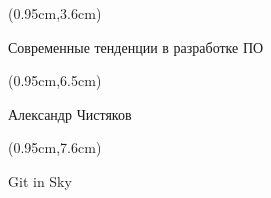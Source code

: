 \documentclass[xetex,18pt,aspectratio=43]{beamer}
\title[Современные тенденции в разработке ПО]{}
\author[Александр Чистяков, Git in Sky]{}
\date{}
\newcommand\Bigfont{\fontsize{22}{22}\selectfont}
\newcommand\Authorfont{\fontsize{17}{17}\selectfont}
\newcommand\Orgfont{\fontsize{13}{13}\selectfont}
\begin{document}
{ %
    \begin{frame}[plain]
      \begin{textblock*}{\framewidth}(0.95cm,3.6cm) %
        \Bigfont
          \begin{center}
          Современные тенденции в разработке ПО
          \end{center}
      \end{textblock*}
      \begin{textblock*}{\framewidth}(0.95cm,6.5cm) %
        \Authorfont
          \begin{center}
          Александр Чистяков
          \end{center}
      \end{textblock*}
      \begin{textblock*}{\framewidth}(0.95cm,7.6cm) %
        \Orgfont
          \begin{center}
          Git in Sky
          \end{center}
      \end{textblock*}
     \end{frame}
}
\end{document}
